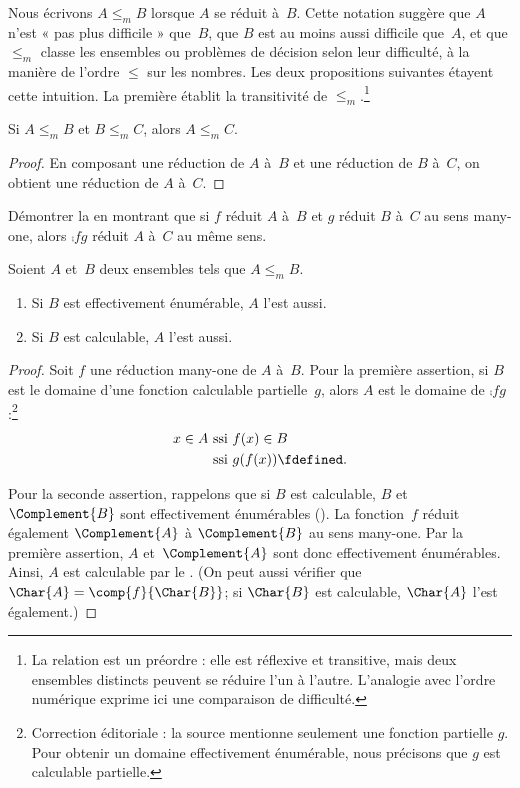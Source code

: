 \documentclass[../../../include/open-logic-section]{subfiles}
\begin{document}

Nous écrivons $A\leq_m B$ lorsque $A$ se réduit
à~$B$. Cette notation suggère que $A$ n'est
« pas plus difficile » que~$B$, que $B$ est au
moins aussi difficile que~$A$, et que $\le_m$
classe les ensembles ou problèmes de décision
selon leur difficulté, à la manière de l'ordre
$\le$ sur les nombres. Les deux propositions
suivantes étayent cette intuition. La première
établit la transitivité de $\le_m$.\footnote{La relation est un préordre : elle est réflexive et transitive, mais deux ensembles distincts peuvent se réduire l'un à l'autre. L'analogie avec l'ordre numérique exprime ici une comparaison de difficulté.}

\begin{prop}
Si $A\leq_m B$ et $B\leq_m C$, alors $A\leq_m C$.
\end{prop}

\begin{proof}
En composant une réduction de $A$ à~$B$ et une
réduction de $B$ à~$C$, on obtient une réduction
de $A$ à~$C$.
\end{proof}

\begin{prob}
Démontrer la  en montrant
que si $f$ réduit $A$ à~$B$ et $g$ réduit $B$
à~$C$ au sens many-one, alors $\comp{f}{g}$
réduit $A$ à~$C$ au même sens.
\end{prob}

\begin{prop}
Soient $A$ et~$B$ deux ensembles tels que
$A\leq_m B$.
\begin{enumerate}
\item Si $B$ est effectivement énumérable,
  $A$ l'est aussi.
\item Si $B$ est calculable, $A$ l'est aussi.
\end{enumerate}
\end{prop}

\begin{proof}
Soit $f$ une réduction many-one de $A$ à~$B$.
Pour la première assertion, si $B$ est le
domaine d'une fonction calculable partielle~$g$,
alors $A$ est le domaine de $\comp{f}{g}$ :\footnote{Correction éditoriale : la source mentionne seulement une fonction partielle $g$. Pour obtenir un domaine effectivement énumérable, nous précisons que $g$ est calculable partielle.}
\begin{align*}
x \in A & \text{ ssi } f(x) \in B \\
& \text{ ssi }  g(f(x)) \fdefined.
\end{align*}

Pour la seconde assertion, rappelons que si $B$
est calculable, $B$ et~$\Complement{B}$ sont
effectivement énumérables
(). La fonction~$f$
réduit également $\Complement{A}$ à
$\Complement{B}$ au sens many-one. Par la
première assertion, $A$ et~$\Complement{A}$
sont donc effectivement énumérables. Ainsi,
$A$ est calculable par le .
(On peut aussi vérifier que
$\Char{A}=\comp{f}{\Char{B}}$; si
$\Char{B}$ est calculable, $\Char{A}$ l'est
également.)
\end{proof}
\end{document}
